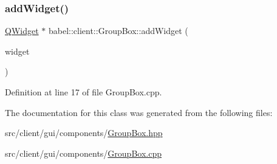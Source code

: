 \subsubsection{\texorpdfstring{add\+Widget()}{addWidget()}}
{\footnotesize\ttfamily \mbox{\hyperlink{class_q_widget}{Q\+Widget}} $\ast$ babel\+::client\+::\+Group\+Box\+::add\+Widget (\begin{DoxyParamCaption}\item[{\mbox{\hyperlink{class_q_widget}{Q\+Widget}} $\ast$}]{widget }\end{DoxyParamCaption})}



Definition at line 17 of file Group\+Box.\+cpp.



The documentation for this class was generated from the following files\+:\begin{DoxyCompactItemize}
\item 
src/client/gui/components/\mbox{\hyperlink{_group_box_8hpp}{Group\+Box.\+hpp}}\item 
src/client/gui/components/\mbox{\hyperlink{_group_box_8cpp}{Group\+Box.\+cpp}}\end{DoxyCompactItemize}
